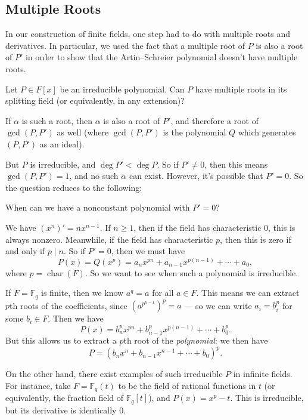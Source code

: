 \subsection{Multiple Roots}

In our construction of finite fields, one step had to do with multiple roots and derivatives. In particular, we used the fact that a multiple root of $P$ is also a root of $P'$ in order to show that the Artin--Schreier polynomial doesn't have multiple roots. 

\begin{qq}
    Let $P \in F[x]$ be an irreducible polynomial. Can $P$ have multiple roots in its splitting field (or equivalently, in any extension)?
\end{qq}

If $\alpha$ is such a root, then $\alpha$ is also a root of $P'$, and therefore a root of $\gcd(P, P')$ as well (where $\gcd(P, P')$ is the polynomial $Q$ which generates $(P, P')$ as an ideal). 

But $P$ is irreducible, and $\deg P' < \deg P$. So if $P' \neq 0$, then this means $\gcd(P, P') = 1$, and no such $\alpha$ can exist. However, it's possible that $P' = 0$. So the question reduces to the following:

\begin{qq}
    When can we have a nonconstant polynomial with $P' = 0$?
\end{qq}

We have $(x^n)' = nx^{n - 1}$. If $n \geq 1$, then if the field has characteristic $0$, this is always nonzero. Meanwhile, if the field has characteristic $p$, then this is zero if and only if $p \mid n$. So if $P' = 0$, then we must have \[P(x) = Q(x^p) = a_nx^{pn} + a_{n - 1}x^{p(n - 1)} + \cdots + a_0,\] where $p = \operatorname{char}(F)$. So we want to see when such a polynomial is irreducible. 

If $F = \mathbb{F}_q$ is finite, then we know $a^q = a$ for all $a \in F$. This means we can extract $p$th roots of the coefficients, since $(a^{p^{n - 1}})^p = a$ --- so we can write $a_i = b_i^p$ for some $b_i \in F$. Then we have \[P(x) = b_n^px^{pn} + b_{n - 1}^px^{p(n - 1)} + \cdots + b_0^p.\] But this allows us to extract a $p$th root of the \emph{polynomial}: we then have \[P = (b_nx^n + b_{n - 1}x^{n - 1} + \cdots + b_0)^p.\] 

On the other hand, there exist examples of such irreducible $P$ in infinite fields. For instance, take $F = \mathbb{F}_q(t)$ to be the field of rational functions in $t$ (or equivalently, the fraction field of $\mathbb{F}_q[t]$), and $P(x) = x^p - t$. This is irreducible, but its derivative is identically $0$. 

